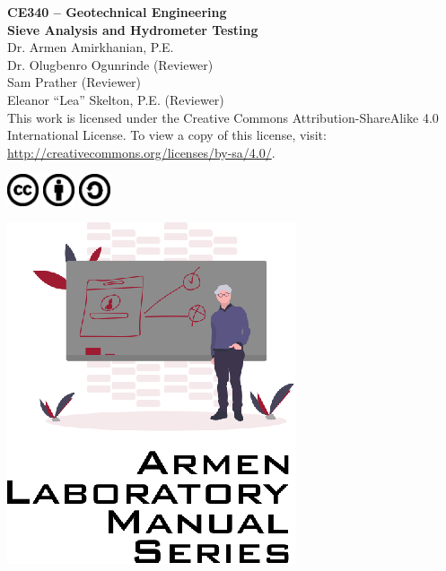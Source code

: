 \documentclass[12pt]{article}
\newcommand{\CourseNum}{CE340}
\newcommand{\CourseName}{Geotechnical Engineering}
\newcommand{\LabTitle}{Sieve Analysis and Hydrometer Testing}
\begin{document}
\begin{titlepage}
\begin{flushright}
\LARGE{\textbf{\CourseNum{} -- \CourseName}}\\
\vfill
\Huge{\textbf{\LabTitle}}\\
    \vfill
    \large Dr. Armen Amirkhanian, P.E.\\
    \normalsize Dr. Olugbenro Ogunrinde (Reviewer)\\
    \normalsize Sam Prather (Reviewer)\\
    \normalsize Eleanor ``Lea'' Skelton, P.E. (Reviewer)\\
\vfill
\normalsize This work is licensed under the Creative Commons Attribution-ShareAlike 4.0 International License. To view a copy of this license, visit:
\href{http://creativecommons.org/licenses/by-sa/4.0/}{http://creativecommons.org/licenses/by-sa/4.0/}.

\includegraphics[width=0.07\textwidth]{cc.eps}
\includegraphics[width=0.07\textwidth]{by.eps}
\includegraphics[width=0.07\textwidth]{sa.eps}
\vfill

\includegraphics[width=0.3\linewidth]{Logo.eps}\\ 
 
  
\end{flushright}
\end{titlepage}
\end{document}
